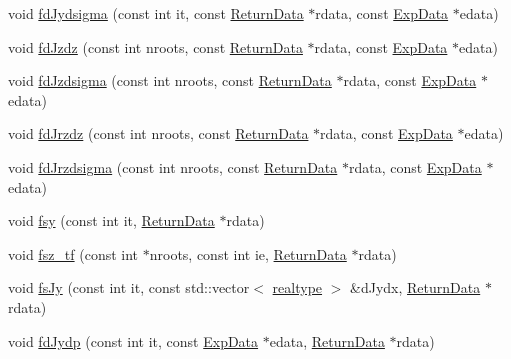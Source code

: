 \begin{DoxyCompactItemize}
\item 
void \mbox{\hyperlink{classamici_1_1_model_aa683851edd9a578fda8e3f29465c313f}{fd\+Jydsigma}} (const int it, const \mbox{\hyperlink{classamici_1_1_return_data}{Return\+Data}} $\ast$rdata, const \mbox{\hyperlink{classamici_1_1_exp_data}{Exp\+Data}} $\ast$edata)
\item 
void \mbox{\hyperlink{classamici_1_1_model_a2506c3b5baa2f4de9236df5ca443c19a}{fd\+Jzdz}} (const int nroots, const \mbox{\hyperlink{classamici_1_1_return_data}{Return\+Data}} $\ast$rdata, const \mbox{\hyperlink{classamici_1_1_exp_data}{Exp\+Data}} $\ast$edata)
\item 
void \mbox{\hyperlink{classamici_1_1_model_ab4e0c14948c6af3b5c877f30f0100954}{fd\+Jzdsigma}} (const int nroots, const \mbox{\hyperlink{classamici_1_1_return_data}{Return\+Data}} $\ast$rdata, const \mbox{\hyperlink{classamici_1_1_exp_data}{Exp\+Data}} $\ast$edata)
\item 
void \mbox{\hyperlink{classamici_1_1_model_ac3f8bf431f374d77ba9190a460043009}{fd\+Jrzdz}} (const int nroots, const \mbox{\hyperlink{classamici_1_1_return_data}{Return\+Data}} $\ast$rdata, const \mbox{\hyperlink{classamici_1_1_exp_data}{Exp\+Data}} $\ast$edata)
\item 
void \mbox{\hyperlink{classamici_1_1_model_a3e6a11cdaa35b6e85d013eb9f63564d2}{fd\+Jrzdsigma}} (const int nroots, const \mbox{\hyperlink{classamici_1_1_return_data}{Return\+Data}} $\ast$rdata, const \mbox{\hyperlink{classamici_1_1_exp_data}{Exp\+Data}} $\ast$edata)
\item 
void \mbox{\hyperlink{classamici_1_1_model_a6b1c331013c5947e77129cb4da82713e}{fsy}} (const int it, \mbox{\hyperlink{classamici_1_1_return_data}{Return\+Data}} $\ast$rdata)
\item 
void \mbox{\hyperlink{classamici_1_1_model_a6c533c9b3476d81336d1758a817d0746}{fsz\+\_\+tf}} (const int $\ast$nroots, const int ie, \mbox{\hyperlink{classamici_1_1_return_data}{Return\+Data}} $\ast$rdata)
\item 
void \mbox{\hyperlink{classamici_1_1_model_a5fb9c238393913d05fed401af5b7f201}{fs\+Jy}} (const int it, const std\+::vector$<$ \mbox{\hyperlink{namespaceamici_a1bdce28051d6a53868f7ccbf5f2c14a3}{realtype}} $>$ \&d\+Jydx, \mbox{\hyperlink{classamici_1_1_return_data}{Return\+Data}} $\ast$rdata)
\item 
void \mbox{\hyperlink{classamici_1_1_model_a6aaa9335fd78ec5e450665bc70de3196}{fd\+Jydp}} (const int it, const \mbox{\hyperlink{classamici_1_1_exp_data}{Exp\+Data}} $\ast$edata, \mbox{\hyperlink{classamici_1_1_return_data}{Return\+Data}} $\ast$rdata)

\end{DoxyCompactItemize}
